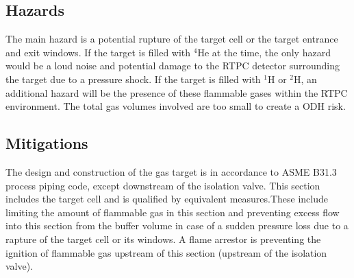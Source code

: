 \subsection{Hazards} 

The main hazard is a potential rupture of the target cell or the target entrance and exit windows. 
If the target is filled with $^4$He at the time, the only hazard would be a loud noise and potential damage
to the RTPC detector surrounding the target due to a pressure shock. If the target is filled with
$^1$H or $^2$H, an additional hazard will be the presence of these flammable gases within the RTPC
environment. The total gas volumes involved are too small to create a ODH risk.

%

\subsection{Mitigations}

The design and construction of the gas target is in accordance to ASME B31.3 
process piping code, except downstream of the isolation valve. This section 
includes the target cell and is qualified by equivalent measures.These include 
limiting the amount of flammable gas in this section and preventing excess flow 
into this section from the buffer volume in case of a sudden pressure loss due 
to a rapture of the target cell or its windows.  A flame arrestor is preventing 
the ignition of flammable gas upstream of this section (upstream of the 
isolation valve).


